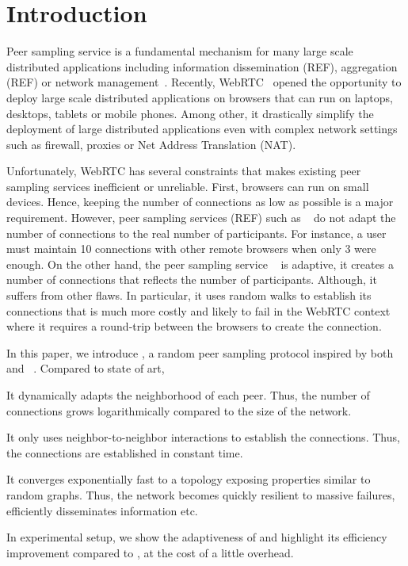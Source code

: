 
\section{Introduction}

Peer sampling service is a fundamental mechanism for many large scale
distributed applications including information dissemination (REF), aggregation
(REF) or network management~\cite{jelasity2007gossip}. Recently,
WebRTC~\cite{webrtc} opened the opportunity to deploy large scale distributed
applications on browsers that can run on laptops, desktops, tablets or mobile
phones. Among other, it drastically simplify the deployment of large
distributed applications even with complex network settings such as firewall,
proxies or Net Address Translation (NAT).

Unfortunately, WebRTC has several constraints that makes existing peer sampling
services inefficient or unreliable. First, browsers can run on small
devices. Hence, keeping the number of connections as low as possible is a major
requirement. However, peer sampling services (REF) such as \CYCLON{}~\cite{
  voulgaris2005cyclon} do not adapt the number of connections to the real
number of participants. For instance, a user must maintain 10 connections with
other remote browsers when only 3 were enough. On the other hand, the peer
sampling service \SCAMP{}~\cite{ganesh2003peer} is adaptive, it creates a
number of connections that reflects the number of participants. Although, it
suffers from other flaws. In particular, it uses random walks to establish its
connections that is much more costly and likely to fail in the WebRTC context
where it requires a round-trip between the browsers to create the connection.

In this paper, we introduce \SCAMPLON{}, a random peer sampling protocol
inspired by both \SCAMP{}~\cite{ganesh2003peer} and
\CYCLON{}~\cite{voulgaris2005cyclon}. Compared to state of art,
\begin{inparaenum}[(i)]
\item It dynamically adapts the neighborhood of each peer. Thus, the number of
  connections grows logarithmically compared to the size of the network.
\item It only uses neighbor-to-neighbor interactions to establish the
  connections. Thus, the connections are established in constant time.
\item It converges exponentially fast to a topology exposing properties similar
  to random graphs. Thus, the network becomes quickly resilient to massive
  failures, efficiently disseminates information etc.
\item In experimental setup, we show the adaptiveness of \SCAMPLON{} and
  highlight its efficiency improvement compared to \CYCLON{}, at the cost of a
  little overhead.
\end{inparaenum}


